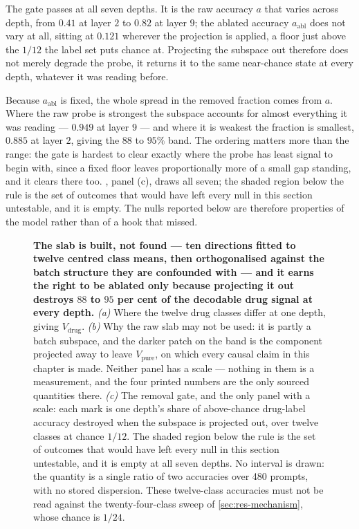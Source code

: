 The gate passes at all seven depths. It is the raw accuracy $a$ that varies
across depth, from $0.41$ at layer $2$ to $0.82$ at layer $9$; the ablated
accuracy $a_{\textrm{abl}}$ does not vary at all, sitting at $0.121$ wherever
the projection is applied, a floor just above the $1/12$ the label set puts
chance at. Projecting the subspace out therefore does not merely degrade the
probe, it returns it to the same near-chance state at every depth, whatever it
was reading before.

Because $a_{\textrm{abl}}$ is fixed, the whole spread in the removed fraction
comes from $a$. Where the raw probe is strongest the subspace accounts for
almost everything it was reading --- $0.949$ at layer $9$ --- and where it is
weakest the fraction is smallest, $0.885$ at layer $2$, giving the $88$ to
$95\%$ band. The ordering matters more than the range: the gate is hardest to
clear exactly where the probe has least signal to begin with, since a fixed
floor leaves proportionally more of a small gap standing, and it clears there
too. , panel (c), draws all seven; the shaded region below the
rule is the set of outcomes that would have left every null in this section
untestable, and it is empty. The nulls reported below are therefore properties
of the model rather than of a hook that missed.

\begin{figure}[htbp]
\begin{fullwidth}
\centering

\caption[The drug slab and its removal gate]{\textbf{The slab is built, not
found --- ten directions fitted to twelve centred class means, then
orthogonalised against the batch structure they are confounded with --- and it
earns the right to be ablated only because projecting it out destroys $88$ to
$95$ per cent of the decodable drug signal at every depth.} \emph{(a)} Where the
twelve drug classes differ at one depth, giving $V_{\textrm{drug}}$.
\emph{(b)} Why the raw slab may not be used: it is partly a batch subspace, and
the darker patch on the band is the component projected away to leave
$V_{\textrm{pure}}$, on which every causal claim in this chapter is made.
Neither panel has a scale --- nothing in them is a measurement, and the four
printed numbers are the only sourced quantities there. \emph{(c)} The removal
gate, and the only panel with a scale: each mark is one depth's share of
above-chance drug-label accuracy destroyed when the subspace is projected out,
over twelve classes at chance $1/12$. The shaded region below the rule is the
set of outcomes that would have left every null in this section untestable, and
it is empty at all seven depths. No interval is drawn: the quantity is a single
ratio of two accuracies over \num{480} prompts, with no stored dispersion. These
twelve-class accuracies must not be read against the twenty-four-class sweep of
\cref{sec:res-mechanism}, whose chance is $1/24$.}
\label{fig:purify}
\end{fullwidth}
\end{figure}

